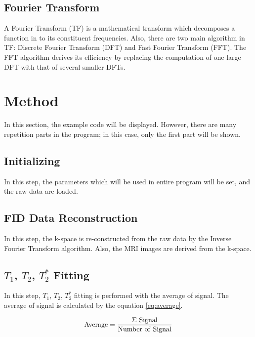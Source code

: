 \documentclass[10pt, a4paper]{article}
\begin{document}
		\subsection{Fourier Transform}
			A Fourier Transform (TF) is a mathematical transform which decomposes a function in to its constituent frequencies. Also, there are two main algorithm in TF: Discrete Fourier Transform (DFT) and Fast Fourier Transform (FFT). The FFT algorithm derives its efficiency by replacing the computation of one large DFT with that of several smaller DFTs. \cite{ref:FFT1}
	
	\section{Method}
		In this section, the example code will be displayed. However, there are many repetition parts in the program; in this case, only the first part will be shown. 
	
		\subsection{Initializing}
			In this step, the parameters which will be used in entire program will be set, and the raw data are loaded. 
			
			
	
		\subsection{FID Data Reconstruction}
			In this step, the k-space is re-constructed from the raw data by the Inverse Fourier Transform algorithm. Also, the MRI images are derived from the k-space. 
		
			
		
		\subsection{$T_1$, $T_2$, $T_2^*$ Fitting}
			In this step, $T_1$, $T_2$, $T_2^*$ fitting is performed with the average of signal. The average of signal is calculated by the equation \ref{eq:average}.
			
			\begin{equation}
				\rm{Average} = \frac{\Sigma \ Signal}{\rm{Number \ of \ Signal}}
				\label{eq:average}
			\end{equation}
		
\end{document}
